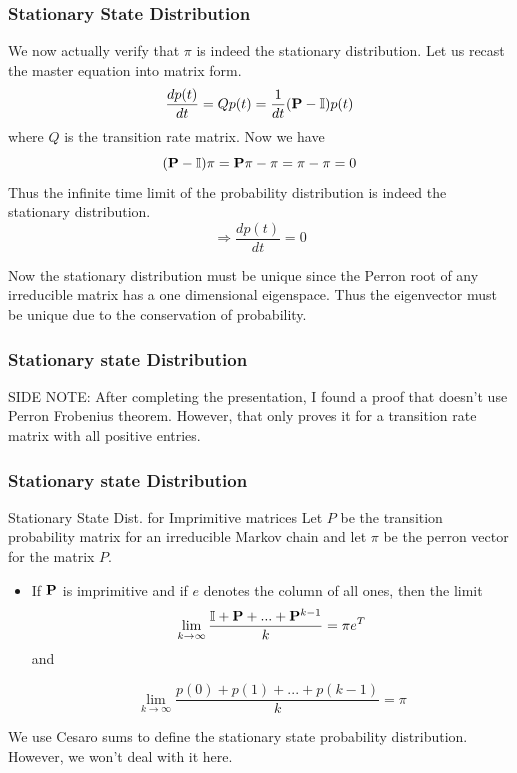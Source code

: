 \documentclass[9pt]{beamer}
\newcommand{\PP}{\bold{P}}
\begin{document}
\begin{frame}
  \frametitle{Stationary State Distribution}
  We now actually verify that $\pi$ is indeed the stationary distribution. 
  Let us recast the master equation into matrix form.
  $$ \frac{d p(t)}{dt} = Q p(t) = \frac{1}{dt}(\PP - \mathbb{I}) p(t)$$ where
  $Q$ is the transition rate matrix. Now we have 
  $$ (\PP - \mathbb{I})\pi = \PP \pi - \pi = \pi -\pi = 0 $$
  Thus the infinite time limit of the probability distribution is indeed the stationary distribution.
  $$  \Rightarrow  \frac{d p(t)}{dt} = 0$$

  Now the stationary distribution must be unique since the Perron root of any irreducible 
  matrix has a one dimensional eigenspace. Thus the eigenvector must be unique due to 
  the conservation of probability.
  \hfill \square
\end{frame}

\begin{frame}
  \frametitle{Stationary state Distribution}
  SIDE NOTE: After completing the presentation, I found a proof that doesn't use Perron Frobenius theorem. However, that only proves it 
  for a transition rate matrix with all positive entries.\cite{PelitiPigolotti2023}
\end{frame}
\begin{frame}
  \frametitle{Stationary state Distribution}
  \begin{block}{Stationary State Dist. for Imprimitive matrices}
  Let $P$ be the transition probability matrix for an irreducible Markov chain and 
  let $\pi$ be the perron vector for the matrix $P$. 
  \begin{itemize}
      \item If $\PP$ is imprimitive and if $e$ denotes the column of all ones, then the limit
        $$\lim_{k \to \infty} \frac{\mathbb{I} + \PP + ... +\PP^{k-1}}{k} = \pi e^T $$ and 
        
        $$ \lim_{k \to \infty} \frac{p(0) + p(1) + ...+p(k-1)}{k} = \pi$$ 
  \end{itemize}
  \end{block}

  We use Cesaro sums to define the stationary state probability distribution. However, we won't deal with it here. 

\end{frame}
\end{document}
